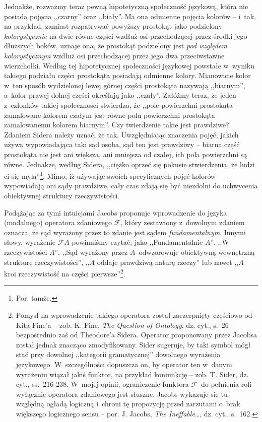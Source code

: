 Jednakże, rozważmy teraz pewną hipotetyczną społeczność językową, która nie posiada pojęcia ,,czarny'' oraz ,,biały''. Ma ona odmienne pojęcia kolorów -- i~tak, na przykład, zamiast rozpatrywać powyższy prostokąt jako podzielony \textit{kolorystycznie} na dwie równe części wzdłuż osi przechodzącej przez środki jego dłuższych boków, uznaje ona, że prostokąt podzielony jest \textit{pod względem kolorystycznym} wzdłuż osi przechodzącej przez jego dwa przeciwstawne wierzchołki. Według tej hipotetycznej społeczności językowej powstałe w~wyniku takiego podziału części prostokąta posiadają odmienne kolory. Mianowicie kolor w~ten sposób wydzielonej lewej górnej części prostokąta nazywają ,,biarnym'', a~kolor prawej dolnej części określają jako ,,czały''. Załóżmy teraz, że jeden z~członków takiej społeczności stwierdza, że ,,pole powierzchni prostokąta zamalowane kolorem czałym jest równe polu powierzchni prostokąta zamalowanemu kolorem biarnym''. Czy twierdzenie takie jest prawdziwe? Zdaniem Sidera należy uznać, że tak. Uwzględniając znaczenia pojęć, jakich używa wypowiadająca taki sąd osoba, sąd ten jest prawdziwy -- biarna część prostokąta nie jest ani większa, ani mniejsza od czałej, ich pola powierzchni są równe. Jednakże, według Sidera, ,,ciężko oprzeć się pokusie stwierdzenia, że ludzi ci się mylą''\footnote{Por. tamże.}. Mimo, iż używając swoich specyficznych pojęć kolorów wypowiadają oni sądy prawdziwe, cały czas zdają się być niezdolni do uchwycenia obiektywnej struktury rzeczywistości.

Podążając za tymi intuicjami Jacobs proponuje wprowadzenie do języka (modalnego) operatora zdaniowego $\mathscr{F}$, który zestawiony z~dowolnym zdaniem oznacza, że sąd wyrażony przez to zdanie jest sądem \textit{fundamentalnym}. Innymi słowy, wyrażenie $\mathscr{F}A$ powinniśmy czytać, jako ,,Fundamentalnie $A$'', ,,W rzeczywistości $A$'', ,,Sąd wyrażony przez $A$~odwzorowuje obiektywną wewnętrzną strukturę rzeczywistości'', ,,$A$ oddaje prawdziwą naturę rzeczy'' lub nawet ,,$A$ kroi rzeczywistość na części pierwsze''\footnote{Pomysł na wprowadzenie takiego operatora został zaczerpnięty częściowo od Kita Fine'a -- zob. K. Fine, \textit{The Question of Ontology}, dz. cyt., s.~26 -- bezpośrednio zaś od Theodore'a Sidera. Operator proponowany przez Jacobsa został jednak znacząco zmodyfikowany. Sider sugeruje, by taki symbol mógł stać przy dowolnej ,,kategorii gramatycznej'' dowolnego wyrażenia językowego. W~szczególności dopuszcza on, by operator ten w~danym wyrażeniu wiązał jakiś funktor, na przykład koniunkcję -- zob. T. Sider, dz. cyt., ss.~216-238. W~mojej opinii, ograniczenie funktora $\mathscr{F}$~do pełnienia roli wyłącznie operatora zdaniowego jest słuszne. Jacobs wykazuje się tu względną ogładą logiczną i~chroni tę propozycję przed zarzutami o~brak większego logicznego sensu -- por. J. Jacobs, \textit{The Ineffable}\ldots, dz. cyt., s.~162.}.

